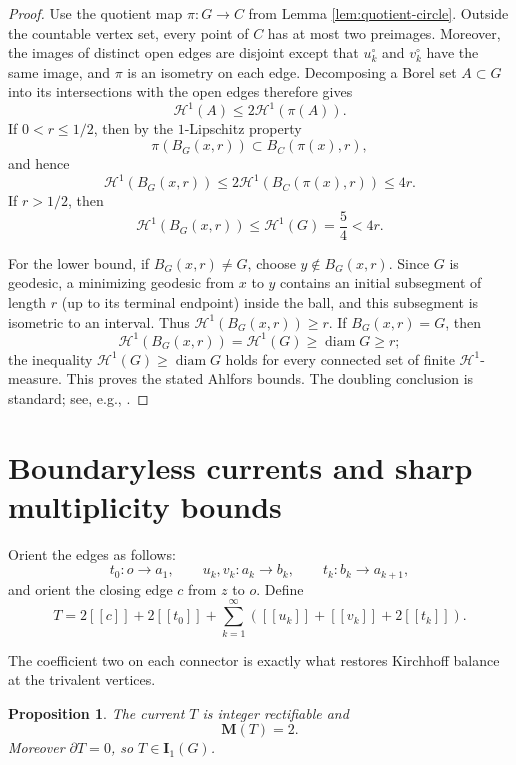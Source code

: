\documentclass[11pt]{article}
\newtheorem{proposition}[theorem]{Proposition}
\theoremstyle{remark}
\newcommand{\M}{\mathbf M}
\newcommand{\I}{\mathbf I}
\newcommand{\Hh}{\mathcal H}
\newcommand{\diam}{\operatorname{diam}}
\newcommand{\llbracket}{[\![}
\newcommand{\rrbracket}{]\!]}
\begin{document}
\begin{proof}
Use the quotient map $\pi:G\to C$ from Lemma \ref{lem:quotient-circle}. Outside the countable vertex set, every point of $C$ has at most two preimages. Moreover, the images of distinct open edges are disjoint except that $u_k^\circ$ and $v_k^\circ$ have the same image, and $\pi$ is an isometry on each edge. Decomposing a Borel set $A\subset G$ into its intersections with the open edges therefore gives
\[
      \Hh^1(A)\le 2\Hh^1(\pi(A)).
\]
If $0<r\le1/2$, then by the $1$-Lipschitz property
\[
 \pi(B_G(x,r))\subset B_C(\pi(x),r),
\]
and hence
\[
 \Hh^1(B_G(x,r))
 \le2\Hh^1(B_C(\pi(x),r))
 \le4r.
\]
If $r>1/2$, then
\[
 \Hh^1(B_G(x,r))\le\Hh^1(G)=\frac54<4r.
\]

For the lower bound, if $B_G(x,r)\neq G$, choose $y\notin B_G(x,r)$. Since $G$ is geodesic, a minimizing geodesic from $x$ to $y$ contains an initial subsegment of length $r$ (up to its terminal endpoint) inside the ball, and this subsegment is isometric to an interval. Thus $\Hh^1(B_G(x,r))\ge r$. If $B_G(x,r)=G$, then
\[
  \Hh^1(B_G(x,r))=\Hh^1(G)\ge\diam G\ge r;
\]
the inequality $\Hh^1(G)\ge\diam G$ holds for every connected set of finite $\Hh^1$-measure. This proves the stated Ahlfors bounds. The doubling conclusion is standard; see, e.g., \cite{Heinonen01,AmbrosioTilli04}.
\end{proof}


\section{Boundaryless currents and sharp multiplicity bounds}\label{sec:current}

Orient the edges as follows:
\[
  t_0:o\to a_1,
  \qquad
  u_k,v_k:a_k\to b_k,
  \qquad
  t_k:b_k\to a_{k+1},
\]
and orient the closing edge $c$ from $z$ to $o$. Define
\begin{equation}\label{eq:T}
  T
  =2\llbracket c\rrbracket+2\llbracket t_0\rrbracket
   +\sum_{k=1}^{\infty}
   \left(\llbracket u_k\rrbracket
        +\llbracket v_k\rrbracket
        +2\llbracket t_k\rrbracket\right).
\end{equation}

The coefficient two on each connector is exactly what restores Kirchhoff balance at the trivalent vertices.

\begin{proposition}\label{prop:Tmass}
The current $T$ is integer rectifiable and
\[
      \M(T)=2.
\]
Moreover $\partial T=0$, so $T\in\I_1(G)$.
\end{proposition}
\end{document}
